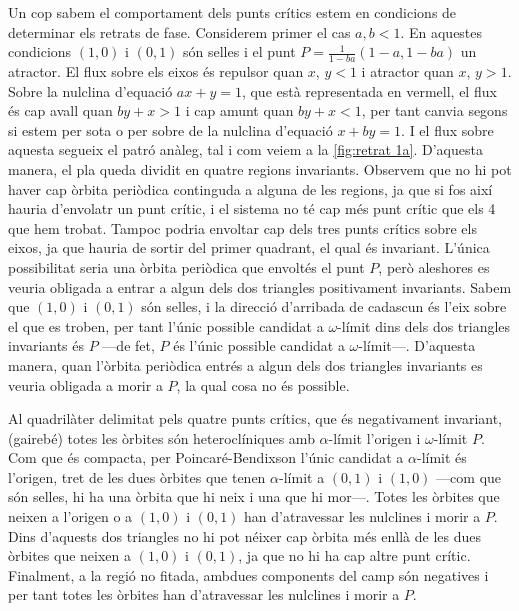 \documentclass[12pt]{article}
\numberwithin{table}{section}
\numberwithin{equation}{section}
\numberwithin{figure}{section}
\begin{document}
Un cop sabem el comportament dels punts crítics estem en condicions de determinar els retrats de fase. Considerem primer el cas \( a,b < 1 \). En aquestes condicions \( (1,0) \) i \( (0,1) \) són selles i el punt \( P = \frac{1}{1 - ba}(1 - a, 1-ba) \) un atractor.  El flux sobre els eixos és repulsor quan \( x \), \( y < 1 \) i atractor quan \( x \), \( y > 1 \). Sobre la nulclina d'equació \( ax + y = 1 \), que està representada en vermell, el flux és cap avall quan \( by + x > 1 \) i cap amunt quan \( by + x < 1 \), per tant canvia segons si estem per sota o per sobre de la nulclina d'equació	\( x + by = 1 \). I el flux sobre aquesta segueix el patró anàleg, tal i com veiem a la \cref{fig:retrat 1a}. D'aquesta manera, el pla queda dividit en quatre regions invariants. Observem que no hi pot haver cap òrbita periòdica continguda a alguna de les regions, ja que si fos així hauria d'envolatr un punt crític, i el sistema no té cap més punt crític que els 4 que hem trobat. Tampoc podria envoltar cap dels tres punts crítics sobre els eixos, ja que hauria de sortir del primer quadrant, el qual és invariant. L'única possibilitat seria una òrbita periòdica que envoltés el punt \( P \), però aleshores es veuria obligada a entrar a algun dels dos triangles positivament invariants. Sabem que \( (1,0) \) i \( (0,1) \) són selles, i la direcció d'arribada de cadascun és l'eix sobre el que es troben, per tant l'únic possible candidat a \( \omega \)-límit dins dels dos triangles invariants és \( P \) ---de fet, \( P \) és l'únic possible candidat a \( \omega \)-límit---. D'aquesta manera, quan l'òrbita periòdica entrés a algun dels dos triangles invariants es veuria obligada a morir a \( P \), la qual cosa no és possible.

Al quadrilàter delimitat pels quatre punts crítics, que és negativament invariant, (gairebé) totes les òrbites són heteroclíniques amb \( \alpha \)-límit l'origen i \( \omega \)-límit \( P \). Com que és compacta, per Poincaré-Bendixson l'únic candidat a \( \alpha \)-límit és l'origen, tret de les dues òrbites que tenen \( \alpha \)-límit a \( (0,1) \) i \( (1,0) \) ---com que són selles, hi ha una òrbita que hi neix i una que hi mor---. Totes les òrbites que neixen a l'origen o a \( (1,0) \) i \( (0,1) \) han d'atravessar les nulclines i morir a \( P \). Dins d'aquests dos triangles no hi pot néixer cap òrbita més enllà de les dues òrbites que neixen a \( (1,0) \) i \( (0,1) \), ja que no hi ha cap altre punt crític. Finalment, a la regió no fitada, ambdues components del camp són negatives i per tant totes les òrbites han d'atravessar les nulclines i morir a \( P \).
\end{document}
